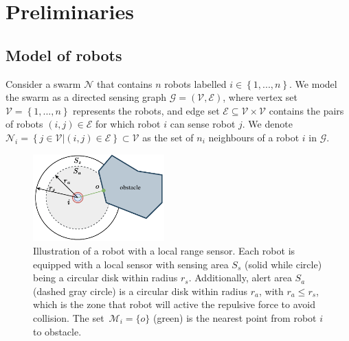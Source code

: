 \section{Preliminaries}\label{sec2}
\subsection{Model of robots}
Consider a swarm $\mathcal{N}$ that contains $n$ robots labelled $i\in\left\{1,...,n\right\}$. We model the swarm as a directed sensing graph $\mathcal{G}=\left(\mathcal{V},\mathcal{E}\right)$, where vertex set $\mathcal{V} = \left\{1,..., n\right\}$ represents the robots, and edge set $\mathcal{E}\subseteq\mathcal{V}\times \mathcal{V}$ contains the pairs of robots $\left(i, j\right)\in\mathcal{E}$ for which robot $i$ can sense robot $j$. We denote $\mathcal{N}_i=\left\{j\in\mathcal{V}|\left(i,j\right)\in\mathcal{E}\right\}\subset\mathcal{V}$ as the set of $n_i$ neighbours of a robot $i$ in $\mathcal{G}$.

\begin{figure}
    \centering
    \includegraphics[width=0.45\textwidth]{paper2/images/model.pdf}
    \caption{Illustration of a robot with a local range sensor. Each robot is equipped with a local sensor with sensing area $S_s$ (solid while circle) being a circular disk within radius $r_s$. Additionally, alert area $S_a$ (dashed gray circle) is a circular disk within radius $r_a$, with $r_a\leq r_s$, which is the zone that robot will active the repulsive force to avoid collision. The set~$\mathcal{M}_i=\{o\}$ (green) is the nearest point from robot $i$ to obstacle.}
    \label{fig:1model}
\end{figure}

